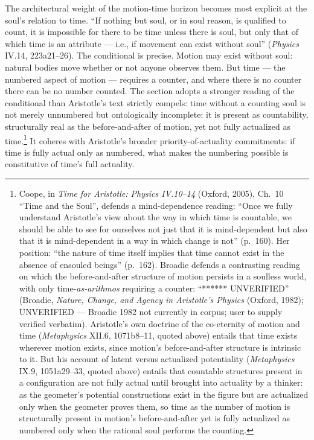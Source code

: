 \documentclass{article}
\begin{document}
The architectural weight of the motion-time horizon becomes most explicit at the soul's relation to time. ``If nothing but soul, or in soul reason, is qualified to count, it is impossible for there to be time unless there is soul, but only that of which time is an attribute --- i.e., if movement can exist without soul'' (\textit{Physics} IV.14, 223a21--26). The conditional is precise. Motion may exist without soul: natural bodies move whether or not anyone observes them. But time --- the numbered aspect of motion --- requires a counter, and where there is no counter there can be no number counted. The section adopts a stronger reading of the conditional than Aristotle's text strictly compels: time without a counting soul is not merely unnumbered but ontologically incomplete: it is present as countability, structurally real as the before-and-after of motion, yet not fully actualized as time.\footnote{Coope, in \textit{Time for Aristotle: Physics IV.10--14} (Oxford, 2005), Ch.~10 ``Time and the Soul'', defends a mind-dependence reading: ``Once we fully understand Aristotle's view about the way in which time is countable, we should be able to see for ourselves not just that it is mind-dependent but also that it is mind-dependent in a way in which change is not'' (p.~160). Her position: ``the nature of time itself implies that time cannot exist in the absence of ensouled beings'' (p.~162). Broadie defends a contrasting reading on which the before-and-after structure of motion persists in a soulless world, with only time-\textit{as-arithmos} requiring a counter: ``****** UNVERIFIED'' (Broadie, \textit{Nature, Change, and Agency in Aristotle's Physics} (Oxford, 1982); UNVERIFIED --- Broadie 1982 not currently in corpus; user to supply verified verbatim). Aristotle's own doctrine of the co-eternity of motion and time (\textit{Metaphysics} XII.6, 1071b8--11, quoted above) entails that time exists wherever motion exists, since motion's before-and-after structure is intrinsic to it. But his account of latent versus actualized potentiality (\textit{Metaphysics} IX.9, 1051a29--33, quoted above) entails that countable structures present in a configuration are not fully actual until brought into actuality by a thinker: as the geometer's potential constructions exist in the figure but are actualized only when the geometer proves them, so time as the number of motion is structurally present in motion's before-and-after yet is fully actualized as numbered only when the rational soul performs the counting.} It coheres with Aristotle's broader priority-of-actuality commitments: if time is fully actual only as numbered, what makes the numbering possible is constitutive of time's full actuality.
\end{document}
